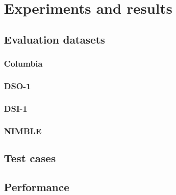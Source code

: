 \chapter{Experiments and results}

\section{Evaluation datasets}

\subsection{Columbia}

\subsection{DSO-1}

\subsection{DSI-1}

\subsection{NIMBLE}

\section{Test cases}

\section{Performance}
